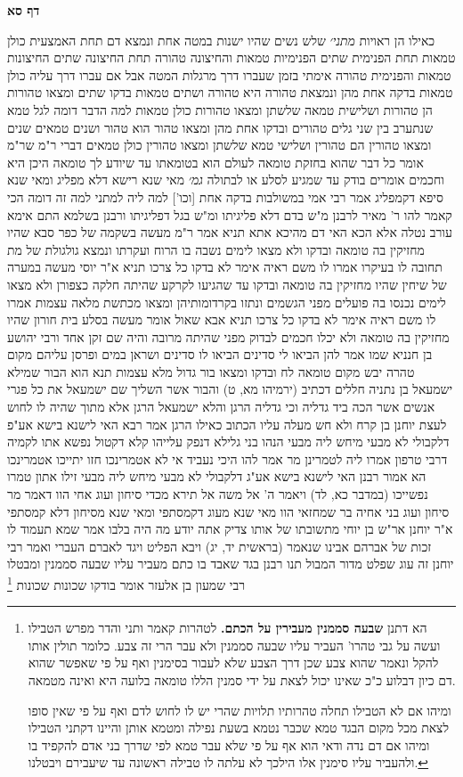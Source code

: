 \documentclass[12pt, openany]{book}
\newcommand{\sethebfont}{
\fontsize{10.5pt}{21.0pt} \selectfont
}
\newcommand{\twocol}[1]{
	{\sethebfont \begin{multicols}{2}
			#1
	\end{multicols}}	
}
\newcommand{\sectname}{}
\newcommand{\newsection}[1]{
	\addcontentsline{toc}{section}{#1}
	\renewcommand{\sectname}{#1}	
	\vspace{-\baselineskip}
	\begin{center}
		\textbf{%
\fontsize{16pt}{16pt}\selectfont
			#1}
	\end{center}
	\vspace{-\baselineskip}
	\nopagebreak
}
\newcommand{\footnotecomment}[1]{\footnote{#1}}
\newcommand{\commenta}[1]{\footnotecomment{#1}}
\begin{document}
\newsection{דף סא}
\twocol{כאילו הן ראויות
{\large\emph{מתני׳}} שלש נשים שהיו ישנות במטה אחת ונמצא דם תחת האמצעית כולן טמאות תחת הפנימית שתים הפנימיות טמאות והחיצונה טהורה  תחת החיצונה שתים החיצונות טמאות והפנימית טהורה 
אימתי בזמן שעברו דרך מרגלות המטה אבל אם עברו דרך עליה כולן טמאות  בדקה אחת מהן ונמצאת טהורה היא טהורה ושתים טמאות  בדקו שתים ומצאו טהורות הן טהורות ושלישית טמאה  שלשתן ומצאו טהורות כולן טמאות 
למה הדבר דומה לגל טמא שנתערב בין שני גלים טהורים ובדקו אחת מהן ומצאו טהור הוא טהור ושנים טמאים  שנים ומצאו טהורין הם טהורין ושלישי טמא 
שלשתן ומצאו טהורין כולן טמאים  דברי ר"מ  שר"מ אומר  כל דבר שהוא בחזקת טומאה לעולם הוא בטומאתו עד שיודע לך טומאה היכן היא 
וחכמים אומרים  בודק עד שמגיע לסלע או לבתולה
{\large\emph{גמ׳}} מאי שנא רישא דלא מפליג ומאי שנא סיפא דקמפליג אמר רבי אמי  במשולבות
בדקה אחת [וכו'] למה ליה למתני למה זה דומה 
הכי קאמר להו ר' מאיר לרבנן  מ"ש בדם דלא פליגיתו ומ"ש בגל דפליגיתו 
ורבנן בשלמא התם אימא עורב נטלה אלא הכא האי דם מהיכא אתא 
תניא אמר ר"מ  מעשה בשקמה של כפר סבא שהיו מחזיקין בה טומאה ובדקו ולא מצאו לימים נשבה בו הרוח ועקרתו ונמצא גולגולת של מת תחובה לו בעיקרו  אמרו לו  משם ראיה  אימר לא בדקו כל צרכו 
תניא א"ר יוסי  מעשה במערה של שיחין שהיו מחזיקין בה טומאה ובדקו עד שהגיעו לקרקע שהיתה חלקה כצפורן ולא מצאו  לימים נכנסו בה פועלים מפני הגשמים  ונתזו בקרדומותיהן ומצאו מכתשת מלאה עצמות  אמרו לו  משם ראיה  אימר לא בדקו כל צרכו 
תניא אבא שאול אומר  מעשה בסלע בית חורון שהיו מחזיקין בה טומאה ולא יכלו חכמים לבדוק מפני שהיתה מרובה  והיה שם זקן אחד ורבי יהושע בן חנניא שמו אמר להן  הביאו לי סדינים  הביאו לו סדינים ושראן במים ופרסן עליהם  מקום טהרה יבש מקום טומאה לח  ובדקו ומצאו בור גדול מלא עצמות 
תנא  הוא הבור שמילא ישמעאל בן נתניה חללים דכתיב  (ירמיהו מא, ט) והבור אשר השליך שם ישמעאל את כל פגרי אנשים אשר הכה ביד גדליה 
וכי גדליה הרגן  והלא ישמעאל הרגן  אלא מתוך שהיה לו לחוש לעצת יוחנן בן קרח ולא חש מעלה עליו הכתוב כאילו הרגן 
אמר רבא  האי לישנא בישא אע"פ דלקבולי לא מבעי מיחש ליה מבעי 
הנהו בני גלילא דנפק עלייהו קלא דקטול נפשא אתו לקמיה דרבי טרפון אמרו ליה  לטמרינן מר  אמר להו  היכי נעביד  אי לא אטמרינכו חזו יתייכו אטמרינכו הא אמור רבנן האי לישנא בישא אע"ג דלקבולי לא מבעי מיחש ליה מבעי זילו אתון טמרו נפשייכו 
(במדבר כא, לד) ויאמר ה' אל משה אל תירא מכדי סיחון ועוג אחי הוו דאמר מר  סיחון ועוג בני אחיה בר שמחזאי הוו  מאי שנא מעוג דקמסתפי ומאי שנא מסיחון דלא קמסתפי 
א"ר יוחנן אר"ש בן יוחי  מתשובתו של אותו צדיק אתה יודע מה היה בלבו אמר  שמא תעמוד לו זכות של אברהם אבינו
שנאמר (בראשית יד, יג) ויבא הפליט ויגד לאברם העברי ואמר רבי יוחנן  זה עוג שפלט מדור המבול 
תנו רבנן  בגד שאבד בו כתם מעביר עליו שבעה סממנין ומבטלו רבי שמעון בן אלעזר אומר
בודקו שכונות שכונות 
\commenta{הא דתנן \textbf{שבעה סממנין מעבירין על הכתם.}  לטהרות קאמר ותני והדר מפרש הטבילו ועשה על גבי טהרו' העביר עליו שבעה סממנין ולא עבר הרי זה צבע. כלומר תולין אותו להקל ונאמר שהוא צבע שכן דרך הצבע שלא לעבור בסימנין ואף על פי שאפשר שהוא דם כיון דבלוע כ"כ שאינו יכול לצאת על ידי סמנין הללו טומאה בלועה היא ואינה מטמאה.\par ומיהו אם לא הטבילו תחלה טהרותיו תלויות שהרי יש לו לחוש לדם ואף על פי שאין סופו לצאת מכל מקום הבגד טמא שכבר נטמא בשעת נפילה ומטמא אותן והיינו דקתני הטבילו ומיהו אם דם נדה ודאי הוא אף על פי שלא עבר טמא לפי שדרך בני אדם להקפיד בו ולהעביר עליו סימנין אלו הילכך לא עלתה לו טבילה ראשונה עד שיעבירם ויבטלנו. }

}
\end{document}
